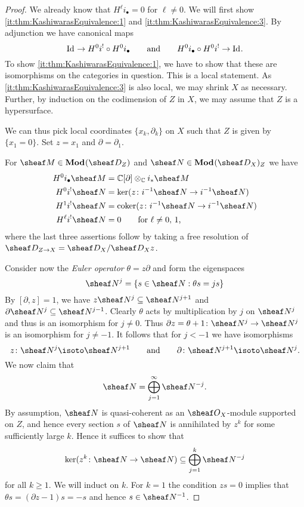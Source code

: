 \documentclass[number-in-sections,a4paper]{notes}
\begin{document}
\begin{proof}
    We already know that $H^\ell i_\bullet = 0$ for $\ell \ne 0$.
    We will first show \ref{it:thm:KashiwarasEquivalence:1} and \ref{it:thm:KashiwarasEquivalence:3}.
    By adjunction we have canonical maps
    \[
        {\mathrm{Id}_{}} \to H^0i^! \circ H^0i_\bullet
        \qquad\text{and}\qquad
        H^0i_\bullet \circ H^0i^! \to {\mathrm{Id}_{}}.
    \]
    To show \ref{it:thm:KashiwarasEquivalence:1}, we have to show that these are isomorphisms on the categories in question.
    This is a local statement.
    As \ref{it:thm:KashiwarasEquivalence:3} is also local, we may shrink $X$ as necessary.
    Further, by induction on the codimension of $Z$ in $X$, we may assume that $Z$ is a hypersurface.

    We can thus pick local coordinates $\{x_k, \partial_k \}$ on $X$ such that $Z$ is given by $\{x_1 = 0\}$.
    Set $z = x_1$ and $\partial = \partial_1$.

    For $\sheaf M \in \catDMod{Z}$ and $\sheaf N \in \catDMod{X}_Z$ we have
    \begin{align*}
        H^0i_\bullet\sheaf M &= \CC[\partial] \otimes_\CC i_*\sheaf M \\
        H^0i^!\sheaf N &= \ker(z\colon i^{-1}\sheaf N \to i^{-1}\sheaf N) \\
        H^1i^!\sheaf N &= \coker(z\colon i^{-1}\sheaf N \to i^{-1}\sheaf N) \\
        H^\ell i^!\sheaf N &= 0 \qquad \text{for $\ell \ne 0,\, 1$,}
    \end{align*}
    where the last three assertions follow by taking a free resolution of $\sD_{Z \to X} = \sD_X/\sD_Xz$.

    Consider now the \emph{Euler operator} $\theta = z\partial$ and form the eigenspaces
    \[
        \sheaf N^j = \{ s \in \sheaf N : \theta s = js \}
    \]
    By $[\partial, z] = 1$, we have $z\sheaf N^j \subseteq \sheaf N^{j+1}$ and $\partial \sheaf N^j \subseteq \sheaf N^{j-1}$.
    Clearly $\theta$ acts by multiplication by $j$ on $\sheaf N^j$ and thus is an isomorphism for $j \ne 0$.
    Thus $\partial z = \theta + 1\colon \sheaf N^j \to \sheaf N^j$ is an isomorphism for $j \ne -1$.
    It follows that for $j < -1$ we have isomorphisms
    \[
        z\colon \sheaf N^j \isoto \sheaf N^{j+1}
        \qquad\text{and}\qquad
        \partial\colon \sheaf N^{j+1} \isoto \sheaf N^{j}.
    \]
    We now claim that
    \begin{equation}\label{eq:thm:KashiwarasEquivalence:V-filtration}
        \sheaf N = \bigoplus_{j=1}^{\infty} \sheaf N^{-j}.
    \end{equation}
    By assumption, $\sheaf N$ is quasi-coherent as an $\sO_X$-module supported on $Z$, and hence every section $s$ of $\sheaf N$ is annihilated by $z^k$ for some sufficiently large $k$.
    Hence it suffices to show that
    \[
        \ker (z^k\colon \sheaf N \to \sheaf N) \subseteq \bigoplus_{j=1}^{k} \sheaf N^{-j}
    \]
    for all $k \ge 1$.
    We will induct on $k$.
    For $k = 1$ the condition $zs = 0$ implies that $\theta s = (\partial z - 1)s = -s$ and hence $s \in \sheaf N^{-1}$.


\end{proof}
\end{document}
